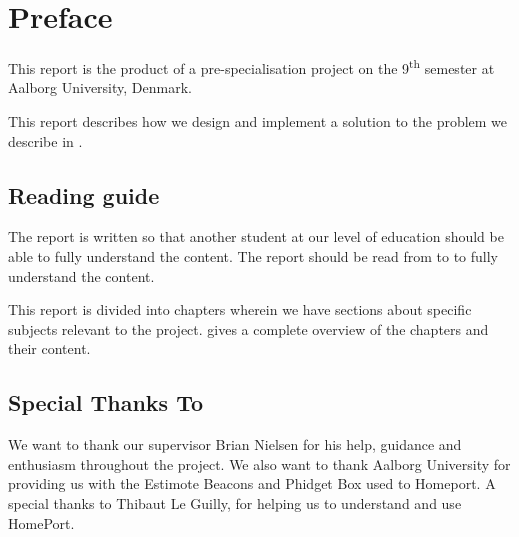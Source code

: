 \section*{Preface}\label{sec:preface}
This report is the product of a pre-specialisation project on the 9\textsuperscript{th} semester at Aalborg University, Denmark. 

This report describes how we design and implement a solution to the problem we describe in . 


\subsection*{Reading guide}
The report is written so that another student at our level of education should be able to fully understand the content. The report should be read from  to  to fully understand the content. 

This report is divided into chapters wherein we have sections about specific subjects relevant to the project.  gives a complete overview of the chapters and their content.

\subsection*{Special Thanks To}
We want to thank our supervisor Brian Nielsen for his help, guidance and enthusiasm throughout the project. We also want to thank Aalborg University for providing us with the Estimote Beacons and Phidget Box used to Homeport. A special thanks to Thibaut Le Guilly, for helping us to understand and use HomePort. 
